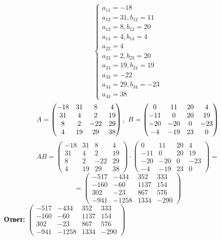 \documentclass[a4paper]{article}
\newcommand{\mat}[1]{\begin{pmatrix} #1 \end{pmatrix}}
\newcommand{\case}[1]{\begin{cases} #1 \end{cases}}
\newcommand{\ts}{\text{\space}}
\begin{document}
\begin{enumerate}
    $$\case{
        a_{11} = -18\\
        a_{12} = 31, b_{12} = 11\\
        a_{13} = 8, b_{13} = 20\\
        a_{14} = 4, b_{14} = 4\\
        a_{22} = 4\\
        a_{23} = 2, b_{23} = 20 \\
        a_{24} = 19, b_{24} = 19 \\
        a_{33} = -22\\
        a_{34} = 29, b_{34} = -23 \\
        a_{44} = 38
    }$$
    $$A = \mat{-18 & 31 & 8 & 4 \\ 31 & 4 & 2 & 19 \\ 8 & 2 & -22 & 29 \\ 4 & 19 & 29 & 38}, \ts
    B = \mat{0 & 11 & 20 & 4 \\ -11 & 0 & 20 & 19 \\ -20 & -20 & 0 & -23 \\ -4 & -19 & 23 & 0}$$
    $$AB = \mat{-18 & 31 & 8 & 4 \\ 31 & 4 & 2 & 19 \\ 8 & 2 & -22 & 29 \\ 4 & 19 & 29 & 38} \cdot \mat{0 & 11 & 20 & 4 \\ -11 & 0 & 20 & 19 \\ -20 & -20 & 0 & -23 \\ -4 & -19 & 23 & 0} =$$
    $$= \mat{-517 & -434 & 352 & 333 \\ -160 & -60 & 1137 & 154 \\ 302 & -23 & 867 & 576 \\ -941 & -1258 & 1334 & -290}$$
    \textbf{Ответ: } $\mat{-517 & -434 & 352 & 333 \\ -160 & -60 & 1137 & 154 \\ 302 & -23 & 867 & 576 \\ -941 & -1258 & 1334 & -290}$


\end{enumerate}
\end{document}
